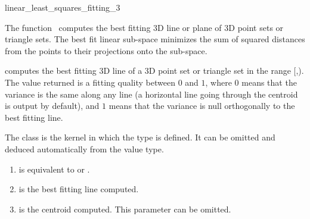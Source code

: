 
\begin{ccRefFunction}{linear_least_squares_fitting_3}  

\ccDefinition
  
The function \ccRefName\ computes the best fitting 3D line or plane of 3D
point sets or triangle sets. The best fit linear sub-space minimizes
the sum of squared distances from the points to their projections onto the
sub-space.


{ computes the best fitting 3D line of a 3D point set or triangle set in the range
[,). The value returned is a fitting quality
between $0$ and $1$, where $0$ means that the variance is the same
along any line (a horizontal line going through the centroid is output
by default), and $1$ means that the variance is null orthogonally
to the best fitting line. }

The class  is the kernel in which the type
 is defined. It can be omitted and
deduced automatically from the value type.


\begin{enumerate}
   \item  {} is equivalent to  or .
   \item  {} is the best fitting line computed.
   \item  {} is the centroid computed. This parameter can be
          omitted.
\end{enumerate}



\end{ccRefFunction}

